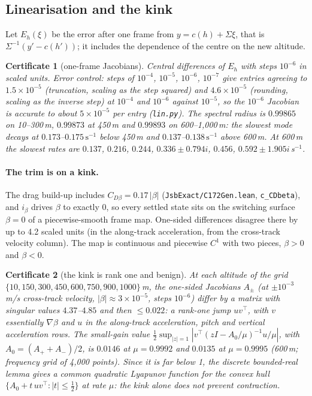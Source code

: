\documentclass[11pt]{article}
\newtheorem{cert}{Certificate}
\begin{document}
\subsection{Linearisation and the kink}

Let $E_h(\xi)$ be the error after one frame from $y = c(h) + \Sigma\xi$, that is $\Sigma^{-1}(y' - c(h'))$; it includes the dependence of the centre on the new altitude.

\begin{cert}[one-frame Jacobians]\label{cert:jac}
Central differences of $E_h$ with steps $10^{-6}$ in scaled units. Error control: steps of $10^{-4}$, $10^{-5}$, $10^{-6}$, $10^{-7}$ give entries agreeing to $1.5\times10^{-5}$ (truncation, scaling as the step squared) and $4.6\times10^{-5}$ (rounding, scaling as the inverse step) at $10^{-4}$ and $10^{-6}$ against $10^{-5}$, so the $10^{-6}$ Jacobian is accurate to about $5\times10^{-5}$ per entry (\texttt{lin.py}). The spectral radius is $0.99865$ on 10--300\,m, $0.99873$ at 450\,m and $0.99893$ on 600--1{,}000\,m: the slowest mode decays at $0.173$--$0.175\,\mathrm{s}^{-1}$ below 450\,m and $0.137$--$0.138\,\mathrm{s}^{-1}$ above 600\,m. At 600\,m the slowest rates are $0.137$, $0.216$, $0.244$, $0.336 \pm 0.794i$, $0.456$, $0.592 \pm 1.905i$\,s$^{-1}$.
\end{cert}

\paragraph{The trim is on a kink.} The drag build-up includes $C_{D\beta} = 0.17\,|\beta|$ (\texttt{JsbExact/C172Gen.lean}, \texttt{c\_CDbeta}), and $i_\beta$ drives $\beta$ to exactly $0$, so every settled state sits on the switching surface $\beta = 0$ of a piecewise-smooth frame map. One-sided differences disagree there by up to 4.2 scaled units (in the along-track acceleration, from the cross-track velocity column). The map is continuous and piecewise $C^1$ with two pieces, $\beta > 0$ and $\beta < 0$.

\begin{cert}[the kink is rank one and benign]\label{cert:kink}
At each altitude of the grid $\{10, 150, 300, 450, 600, 750, 900, 1000\}$\,m, the one-sided Jacobians $A_\pm$ (at $\pm 10^{-3}$\,m/s cross-track velocity, $|\beta| \approx 3\times10^{-5}$, steps $10^{-6}$) differ by a matrix with singular values $4.37$--$4.85$ and then $\le 0.022$: a rank-one jump $u v^\top$, with $v$ essentially $\nabla\beta$ and $u$ in the along-track acceleration, pitch and vertical acceleration rows. The small-gain value $\tfrac12 \sup_{|z|=1} |v^\top(zI - A_0/\mu)^{-1}u/\mu|$, with $A_0 = (A_+ + A_-)/2$, is $0.0146$ at $\mu = 0.9992$ and $0.0135$ at $\mu = 0.9995$ (600\,m; frequency grid of 4{,}000 points). Since it is far below 1, the discrete bounded-real lemma gives a common quadratic Lyapunov function for the convex hull $\{A_0 + t\,u v^\top : |t| \le \tfrac12\}$ at rate $\mu$: the kink alone does not prevent contraction.
\end{cert}
\end{document}
